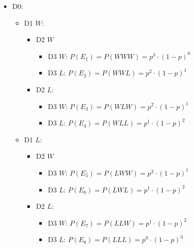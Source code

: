 \documentclass[
]{book}
\providecommand{\tightlist}{%
  \setlength{\itemsep}{0pt}\setlength{\parskip}{0pt}}
\begin{document}
\begin{itemize}
\tightlist
\item
  D0:

  \begin{itemize}
  \tightlist
  \item
    D1 \(W\):

    \begin{itemize}
    \tightlist
    \item
      D2 \(W\)

      \begin{itemize}
      \tightlist
      \item
        D3 \(W\): \(P(E_1)=P(WWW)=p^{3} \cdot (1-p)^{0}\)
      \item
        D3 \(L\): \(P(E_2)=P(WWL)=p^{2} \cdot (1-p)^{1}\)
      \end{itemize}
    \item
      D2 \(L\):

      \begin{itemize}
      \tightlist
      \item
        D3 \(W\): \(P(E_3)=P(WLW)=p^{2} \cdot (1-p)^{1}\)
      \item
        D3 \(L\): \(P(E_4)=P(WLL)=p^{1} \cdot (1-p)^{2}\)
      \end{itemize}
    \end{itemize}
  \item
    D1 \(L\):

    \begin{itemize}
    \tightlist
    \item
      D2 \(W\)

      \begin{itemize}
      \tightlist
      \item
        D3 \(W\): \(P(E_5)=P(LWW)=p^{2} \cdot (1-p)^{1}\)
      \item
        D3 \(L\): \(P(E_6)=P(LWL)=p^{1} \cdot (1-p)^{2}\)
      \end{itemize}
    \item
      D2 \(L\):

      \begin{itemize}
      \tightlist
      \item
        D3 \(W\): \(P(E_7)=P(LLW)=p^{1} \cdot (1-p)^{2}\)
      \item
        D3 \(L\): \(P(E_8)=P(LLL)=p^{0} \cdot (1-p)^{3}\)
      \end{itemize}
    \end{itemize}
  \end{itemize}
\end{itemize}
\end{document}
